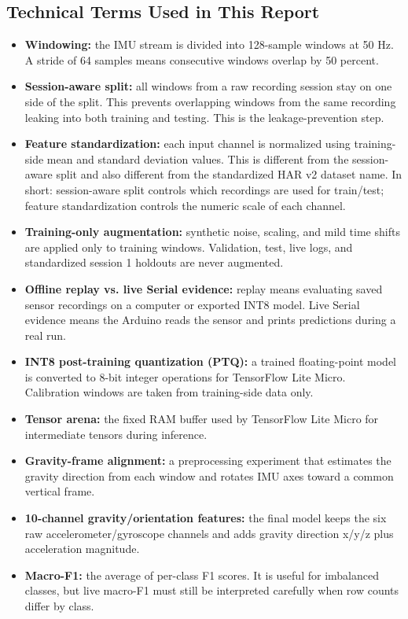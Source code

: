 \documentclass[11pt,a4paper]{article}
\newcommand{\term}[1]{\textbf{#1}}
\begin{document}
\subsection*{Technical Terms Used in This Report}

\begin{itemize}
\item \term{Windowing:} the IMU stream is divided into 128-sample windows at 50 Hz. A stride of 64 samples means consecutive windows overlap by 50 percent.
\item \term{Session-aware split:} all windows from a raw recording session stay on one side of the split. This prevents overlapping windows from the same recording leaking into both training and testing. This is the leakage-prevention step.
\item \term{Feature standardization:} each input channel is normalized using training-side mean and standard deviation values. This is different from the session-aware split and also different from the standardized HAR v2 dataset name. In short: session-aware split controls which recordings are used for train/test; feature standardization controls the numeric scale of each channel.
\item \term{Training-only augmentation:} synthetic noise, scaling, and mild time shifts are applied only to training windows. Validation, test, live logs, and standardized session 1 holdouts are never augmented.
\item \term{Offline replay vs. live Serial evidence:} replay means evaluating saved sensor recordings on a computer or exported INT8 model. Live Serial evidence means the Arduino reads the sensor and prints predictions during a real run.
\item \term{INT8 post-training quantization (PTQ):} a trained floating-point model is converted to 8-bit integer operations for TensorFlow Lite Micro. Calibration windows are taken from training-side data only.
\item \term{Tensor arena:} the fixed RAM buffer used by TensorFlow Lite Micro for intermediate tensors during inference.
\item \term{Gravity-frame alignment:} a preprocessing experiment that estimates the gravity direction from each window and rotates IMU axes toward a common vertical frame.
\item \term{10-channel gravity/orientation features:} the final model keeps the six raw accelerometer/gyroscope channels and adds gravity direction x/y/z plus acceleration magnitude.
\item \term{Macro-F1:} the average of per-class F1 scores. It is useful for imbalanced classes, but live macro-F1 must still be interpreted carefully when row counts differ by class.
\end{itemize}
\end{document}
